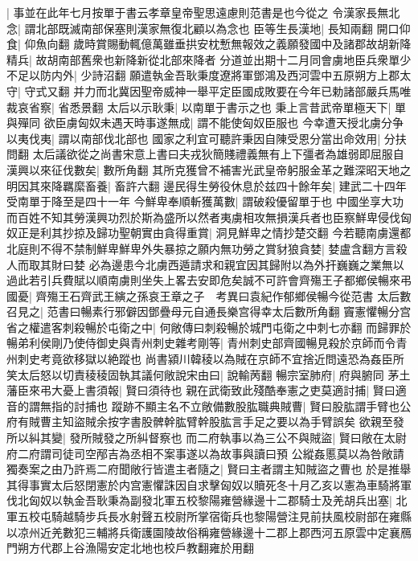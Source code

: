 |{
	事並在此年七月按單于書云孝章皇帝聖思遠慮則范書是也今從之}
令漢家長無北念|{
	謂北部既滅南部保塞則漢家無復北顧以為念也}
臣等生長漢地|{
	長知兩翻}
開口仰食|{
	仰魚向翻}
歲時賞賜動輒億萬雖垂拱安枕慙無報效之義願發國中及諸郡故胡新降精兵|{
	故胡南部舊衆也新降新從北部來降者}
分道並出期十二月同會虜地臣兵衆單少不足以防内外|{
	少詩沼翻}
願遣執金吾耿秉度遼將軍鄧鴻及西河雲中五原朔方上郡太守|{
	守式又翻}
并力而北冀因聖帝威神一舉平定臣國成敗要在今年已勅諸部嚴兵馬唯裁哀省察|{
	省悉景翻}
太后以示耿秉|{
	以南單于書示之也}
秉上言昔武帝單極天下|{
	單與殫同}
欲臣虜匈奴未遇天時事遂無成|{
	謂不能使匈奴臣服也}
今幸遭天授北虜分争以夷伐夷|{
	謂以南部伐北部也}
國家之利宜可聽許秉因自陳受恩分當出命效用|{
	分扶問翻}
太后議欲從之尚書宋意上書曰夫戎狄簡賤禮義無有上下彊者為雄弱即屈服自漢興以來征伐數矣|{
	數所角翻}
其所克獲曾不補害光武皇帝躬服金革之難深昭天地之明因其來降羈縻畜養|{
	畜許六翻}
邊民得生勞役休息於兹四十餘年矣|{
	建武二十四年受南單于降至是四十一年}
今鮮卑奉順斬獲萬數|{
	謂破殺優留單于也}
中國坐享大功而百姓不知其勞漢興功烈於斯為盛所以然者夷虜相攻無損漢兵者也臣察鮮卑侵伐匈奴正是利其抄掠及歸功聖朝實由貪得重賞|{
	洞見鮮卑之情抄楚交翻}
今若聽南虜還都北庭則不得不禁制鮮卑鮮卑外失暴掠之願内無功勞之賞豺狼貪婪|{
	婪盧含翻方言殺人而取其財曰婪}
必為邊患今北虜西遁請求和親宜因其歸附以為外扞巍巍之業無以過此若引兵費賦以順南虜則坐失上畧去安即危矣誠不可許會齊殤王子都鄉侯暢來弔國憂|{
	齊殤王石齊武王縯之孫哀王章之子　考異曰袁紀作郁鄉侯暢今從范書}
太后數召見之|{
	范書曰暢素行邪僻因鄧疊母元自通長樂宫得幸太后數所角翻}
竇憲懼暢分宫省之權遣客刺殺暢於屯衛之中|{
	何敞傳曰刺殺暢於城門屯衛之中刺七亦翻}
而歸罪於暢弟利侯剛乃使侍御史與青州刺史雜考剛等|{
	青州刺史部齊國暢見殺於京師而令青州刺史考竟欲移獄以絶蹤也}
尚書潁川韓稜以為賊在京師不宜捨近問遠恐為姦臣所笑太后怒以切責稜稜固執其議何敞說宋由曰|{
	說輸苪翻}
暢宗室肺府|{
	府與腑同}
茅土藩臣來弔大憂上書須報|{
	賢曰須待也}
親在武衛致此殘酷奉憲之吏莫適討捕|{
	賢曰適音的謂無指的討捕也}
蹤跡不顯主名不立敞備數股肱職典賊曹|{
	賢曰股肱謂手臂也公府有賊曹主知盜賊余按字書股髀幹肱臂幹股肱言手足之要以為手臂誤矣}
欲親至發所以糾其變|{
	發所賊發之所糾督察也}
而二府執事以為三公不與賊盜|{
	賢曰敞在太尉府二府謂司徒司空邴吉為丞相不案事遂以為故事與讀曰預}
公縱姦慝莫以為咎敞請獨奏案之由乃許焉二府聞敞行皆遣主者隨之|{
	賢曰主者謂主知賊盜之曹也}
於是推舉其得事實太后怒閉憲於内宫憲懼誅因自求擊匈奴以贖死冬十月乙亥以憲為車騎將軍伐北匈奴以執金吾耿秉為副發北軍五校黎陽雍營緣邊十二郡騎士及羌胡兵出塞|{
	北軍五校屯騎越騎步兵長水射聲五校尉所掌宿衛兵也黎陽營注見前扶風校尉部在雍縣以凉州近羌數犯三輔將兵衛護園陵故俗稱雍營緣邊十二郡上郡西河五原雲中定襄鴈門朔方代郡上谷漁陽安定北地也校戶教翻雍於用翻}
